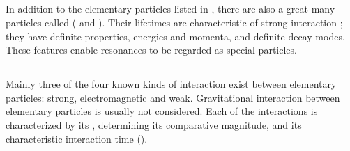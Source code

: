 \subsection{}\label{43.2.4} In addition to the elementary particles listed in , there are also a great many particles called 
( and ). Their lifetimes are characteristic of strong interaction ; they have definite properties, energies and momenta, and definite decay modes. These features enable resonances to be regarded as special particles.

\subsection{}\label{43.2.5} Mainly three of the four known kinds of interaction exist between elementary particles: strong, electromagnetic and weak. Gravitational interaction between elementary particles is usually not considered. Each of the interactions is characterized by its , determining its comparative magnitude, and its characteristic interaction time ().

